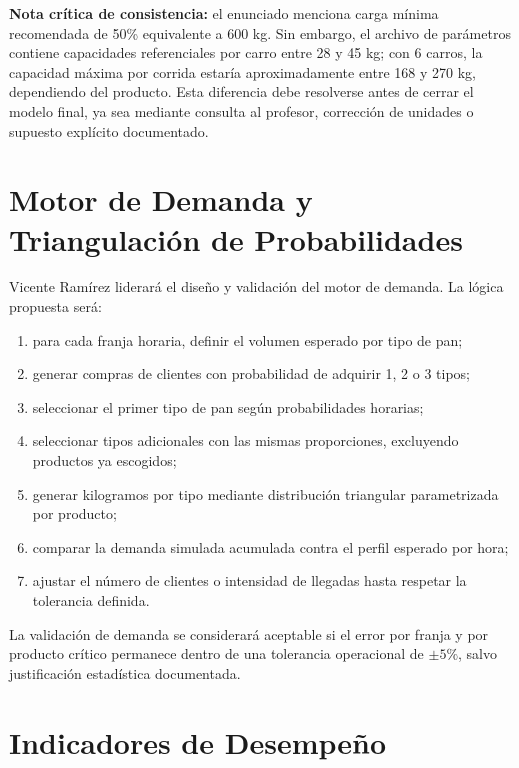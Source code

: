 \documentclass[11pt,letterpaper]{article}
\begin{document}
\textbf{Nota crítica de consistencia:} el enunciado menciona carga mínima recomendada de 50\% equivalente a 600 kg. Sin embargo, el archivo de parámetros contiene capacidades referenciales por carro entre 28 y 45 kg; con 6 carros, la capacidad máxima por corrida estaría aproximadamente entre 168 y 270 kg, dependiendo del producto. Esta diferencia debe resolverse antes de cerrar el modelo final, ya sea mediante consulta al profesor, corrección de unidades o supuesto explícito documentado.

\section{Motor de Demanda y Triangulación de Probabilidades}

Vicente Ramírez liderará el diseño y validación del motor de demanda. La lógica propuesta será:

\begin{enumerate}
  \item para cada franja horaria, definir el volumen esperado por tipo de pan;
  \item generar compras de clientes con probabilidad de adquirir 1, 2 o 3 tipos;
  \item seleccionar el primer tipo de pan según probabilidades horarias;
  \item seleccionar tipos adicionales con las mismas proporciones, excluyendo productos ya escogidos;
  \item generar kilogramos por tipo mediante distribución triangular parametrizada por producto;
  \item comparar la demanda simulada acumulada contra el perfil esperado por hora;
  \item ajustar el número de clientes o intensidad de llegadas hasta respetar la tolerancia definida.
\end{enumerate}

La validación de demanda se considerará aceptable si el error por franja y por producto crítico permanece dentro de una tolerancia operacional de \(\pm 5\%\), salvo justificación estadística documentada.

\section{Indicadores de Desempeño}
\end{document}
